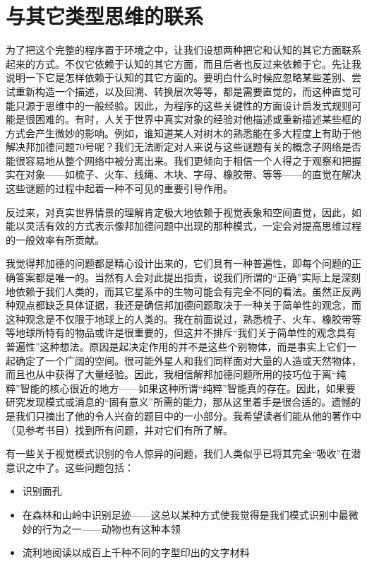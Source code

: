 \section{与其它类型思维的联系}

为了把这个完整的程序置于环境之中，让我们设想两种把它和认知的其它方面联系起来的方式。不仅它依赖于认知的其它方面，而且后者也反过来依赖于它。先让我说明一下它是怎样依赖于认知的其它方面的。要明白什么时候应忽略某些差别、尝试重新构造一个描述，以及回溯、转换层次等等，都是需要直觉的，而这种直觉可能只源于思维中的一般经验。因此，为程序的这些关键性的方面设计启发式规则可能是很困难的。有时，人关于世界中真实对象的经验对他描述或重新描述某些框的方式会产生微妙的影响。例如，谁知道某人对树木的熟悉能在多大程度上有助于他解决邦加德问题70号呢？我们无法断定对人来说与这些谜题有关的概念子网络是否能很容易地从整个网络中被分离出来。我们更倾向于相信一个人得之于观察和把握实在对象——如梳子、火车、线绳、木块、字母、橡胶带、等等——的直觉在解决这些谜题的过程中起着一种不可见的重要引导作用。

反过来，对真实世界情景的理解肯定极大地依赖于视觉表象和空间直觉，因此，如能以灵活有效的方式表示像邦加德问题中出现的那种模式，一定会对提高思维过程的一般效率有所贡献。

我觉得邦加德的问题都是精心设计出来的，它们具有一种普遍性，即每个问题的正确答案都是唯一的。当然有人会对此提出指责，说我们所谓的“正确”实际上是深刻地依赖于我们人类的，而其它星系中的生物可能会有完全不同的看法。虽然正反两种观点都缺乏具体证据，我还是确信邦加德问题取决于一种关于简单性的观念，而这种观念是不仅限于地球上的人类的。我在前面说过，熟悉梳子、火车、橡胶带等等地球所特有的物品或许是很重要的，但这并不排斥“我们关于简单性的观念具有普遍性”这种想法。原因是起决定作用的并不是这些个别物体，而是事实上它们一起确定了一个广阔的空间。很可能外星人和我们同样面对大量的人造或天然物体，而且也从中获得了大量经验。因此，我相信解邦加德问题所用的技巧位于离“纯粹”智能的核心很近的地方——如果这种所谓“纯粹”智能真的存在。因此，如果要研究发现模式或消息的“固有意义”所需的能力，那从这里着手是很合适的。遗憾的是我们只摘出了他的令人兴奋的题目中的一小部分。我希望读者们能从他的著作中（见参考书目）找到所有问题，并对它们有所了解。

有一些关于视觉模式识别的令人惊异的问题，我们人类似乎已将其完全“吸收”在潜意识之中了。这些问题包括：
\begin{itemize}
\item 识别面孔
\item 在森林和山岭中识别足迹——这总以某种方式使我觉得是我们模式识别中最微妙的行为之一——动物也有这种本领
\item 流利地阅读以成百上千种不同的字型印出的文字材料
\end{itemize}

